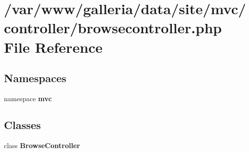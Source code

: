 \section{/var/www/galleria/data/site/mvc/controller/browsecontroller.php File Reference}
\label{browsecontroller_8php}
\subsection*{Namespaces}
\begin{CompactItemize}
\item 
namespace {\bf mvc}
\end{CompactItemize}
\subsection*{Classes}
\begin{CompactItemize}
\item 
class {\bf BrowseController}
\end{CompactItemize}
